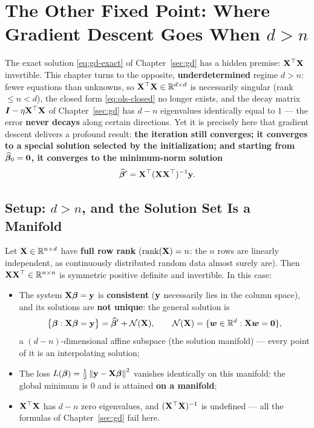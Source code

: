 \section{The Other Fixed Point: Where Gradient Descent Goes When $d > n$}\label{sec:gd-underdet}

The exact solution \eqref{eq:gd-exact} of Chapter~\ref{sec:gd} has a hidden premise: $\mathbf{X}^\top\mathbf{X}$ invertible. This chapter turns to the opposite, \textbf{underdetermined} regime $d > n$: fewer equations than unknowns, so $\mathbf{X}^\top\mathbf{X} \in \mathbb{R}^{d \times d}$ is necessarily singular (rank $\le n < d$), the closed form \eqref{eq:ols-closed} no longer exists, and the decay matrix $\bm{I} - \eta\mathbf{X}^\top\mathbf{X}$ of Chapter~\ref{sec:gd} has $d - n$ eigenvalues identically equal to $1$ — the error \textbf{never decays} along certain directions. Yet it is precisely here that gradient descent delivers a profound result: \textbf{the iteration still converges; it converges to a special solution selected by the initialization; and starting from $\widehat{\bm{\beta}}_0 = \mathbf{0}$, it converges to the minimum-norm solution}
\[
  \widehat{\bm{\beta}}' = \mathbf{X}^\top (\mathbf{X} \mathbf{X}^\top)^{-1} \mathbf{y} .
\]

\subsection{Setup: $d > n$, and the Solution Set Is a Manifold}\label{sec:underdet-setup}

Let $\mathbf{X} \in \mathbb{R}^{n \times d}$ have \textbf{full row rank} ($\mathrm{rank}(\mathbf{X}) = n$: the $n$ rows are linearly independent, as continuously distributed random data almost surely are). Then $\mathbf{X}\mathbf{X}^\top \in \mathbb{R}^{n \times n}$ is symmetric positive definite and invertible. In this case:

\begin{itemize}
  \item The system $\mathbf{X} \bm{\beta} = \mathbf{y}$ is \textbf{consistent} ($\mathbf{y}$ necessarily lies in the column space), and its solutions are \textbf{not unique}: the general solution is
  \[
    \big\{ \bm{\beta} : \mathbf{X} \bm{\beta} = \mathbf{y} \big\} = \widehat{\bm{\beta}}' + \mathcal{N}(\mathbf{X}),
    \qquad
    \mathcal{N}(\mathbf{X}) = \{ \bm{w} \in \mathbb{R}^d : \mathbf{X} \bm{w} = \mathbf{0} \},
  \]
  a $(d - n)$-dimensional affine subspace (the solution manifold) — every point of it is an interpolating solution;
  \item The loss $L(\bm{\beta}) = \frac{1}{2}\left\lVert \mathbf{y} - \mathbf{X}\bm{\beta} \right\rVert^2$ vanishes identically on this manifold: the global minimum is $0$ and is attained \textbf{on a manifold};
  \item $\mathbf{X}^\top\mathbf{X}$ has $d - n$ zero eigenvalues, and $(\mathbf{X}^\top\mathbf{X})^{-1}$ is undefined — all the formulas of Chapter~\ref{sec:gd} fail here.
\end{itemize}


